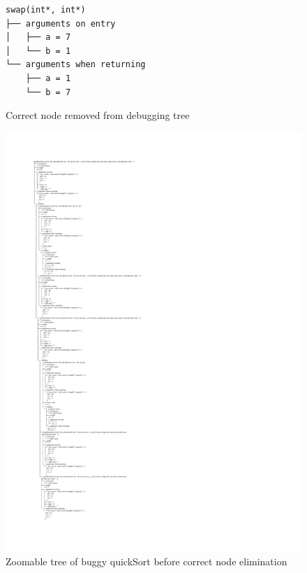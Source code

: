 \begin{figure}
\centering
\caption{Correct node removed from debugging tree}
\label{fig:removedNode}
\begin{verbatim}
swap(int*, int*)
├── arguments on entry
│   ├── a = 7
│   └── b = 1
└── arguments when returning
    ├── a = 1
    └── b = 7
\end{verbatim}
\end{figure}
\begin{figure}
\centering
    \caption{Zoomable tree of buggy quickSort before correct node elimination}
    \label{fig:buggyTreeBefore}
\includegraphics[width=\textwidth,height=\textheight,keepaspectratio]{Imagenes/Vectorial/buggy.pdf}
\end{figure}

